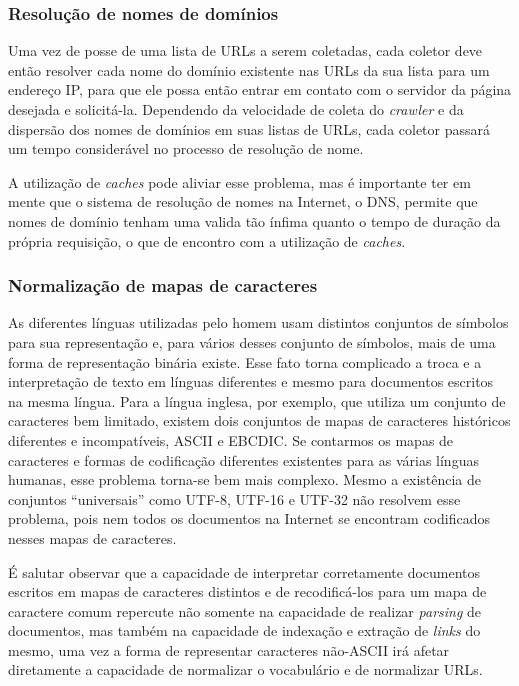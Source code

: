 \documentclass[10pt,twocolumn]{article}
\begin{document}
\subsubsection{Resolução de nomes de domínios}
Uma vez de posse de uma lista de URLs a serem coletadas, cada coletor
deve então resolver cada nome do domínio existente nas URLs da sua lista
para um endereço IP, para que ele possa então entrar em contato com o
servidor da página desejada e solicitá-la. Dependendo da velocidade de
coleta do \emph{crawler} e da dispersão dos nomes de domínios em suas
listas de URLs, cada coletor passará um tempo considerável no processo de
resolução de nome.

A utilização de \emph{caches} pode aliviar esse problema, mas é
importante ter em mente que o sistema de resolução de nomes na Internet,
o DNS, permite que nomes de domínio tenham uma valida tão ínfima quanto
o tempo de duração da própria requisição, o que de encontro com a
utilização de \emph{caches}.

\subsubsection{Normalização de mapas de caracteres}

As diferentes línguas utilizadas pelo homem usam distintos conjuntos de
símbolos para sua representação e, para vários desses conjunto de
símbolos, mais de uma forma de representação binária existe. Esse fato
torna complicado a troca e a interpretação de texto em línguas diferentes
e mesmo para documentos escritos na mesma língua. Para a língua inglesa,
por exemplo, que utiliza um conjunto de caracteres bem limitado, existem
dois conjuntos de mapas de caracteres históricos diferentes e
incompatíveis, ASCII e EBCDIC. Se contarmos os mapas de caracteres e
formas de codificação diferentes existentes para as várias línguas
humanas, esse problema torna-se bem mais complexo.
Mesmo a existência de conjuntos ``universais'' como UTF-8, UTF-16 e
UTF-32 não resolvem esse problema, pois nem todos os documentos na
Internet se encontram codificados nesses mapas de caracteres.

É salutar observar que a capacidade de interpretar corretamente
documentos escritos em mapas de caracteres distintos e de recodificá-los
para um mapa de caractere comum  repercute não somente na capacidade de
realizar \emph{parsing} de documentos, mas também na capacidade de
indexação e extração de \emph{links} do mesmo, uma vez a forma de
representar caracteres não-ASCII irá afetar diretamente a capacidade de
normalizar o vocabulário e de normalizar URLs.
\end{document}
